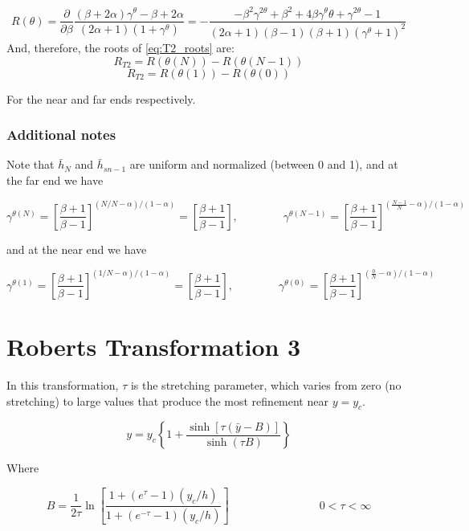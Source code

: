 \documentclass[11pt]{article}
\newcommand{\g}{\gamma}
\begin{document}
\begin{equation} \label{eq:T2_prime}
	R(\theta) = \frac{\partial}{\partial \beta}
	\frac{(\beta+2\alpha)\g^{\theta} - \beta + 2\alpha}{(2\alpha+1) \left(1+\g^{\theta} \right)}
	= - \frac{- \beta^{2} \g^{2 \theta} + \beta^{2} + 4 \beta \g^{\theta} \theta + \g^{2 \theta} - 1}{\left(2 \alpha + 1\right) \left(\beta - 1\right) \left(\beta + 1\right) \left(\g^{\theta} + 1\right)^{2}}
\end{equation}
And, therefore, the roots of \ref{eq:T2_roots} are:
\begin{equation}
	R_{T2} = R(\theta(N)) - R(\theta(N-1))
\end{equation}
\begin{equation}
	R_{T2} = R(\theta(1)) - R(\theta(0))
\end{equation}

For the near and far ends respectively.

\subsubsection{Additional notes}
Note that $\bar{h}_{N}$ and $\bar{h}_{sn-1}$ are uniform and normalized (between 0 and 1), and at the far end we have

\begin{equation}
	\g^{\theta(N)} = \left[
	\frac{\beta+1}{\beta-1}
	\right]^{(N/N-\alpha)/(1-\alpha)} =
	\left[
	\frac{\beta+1}{\beta-1}
	\right]
	, \qquad \qquad
	\g^{\theta(N-1)} = \left[
	\frac{\beta+1}{\beta-1}
	\right]^{(\frac{N-1}{N}-\alpha)/(1-\alpha)}
\end{equation}

and at the near end we have

\begin{equation}
	\g^{\theta(1)} = \left[
	\frac{\beta+1}{\beta-1}
	\right]^{(1/N-\alpha)/(1-\alpha)} =
	\left[
	\frac{\beta+1}{\beta-1}
	\right]
	, \qquad \qquad
	\g^{\theta(0)} = \left[
	\frac{\beta+1}{\beta-1}
	\right]^{(\frac{0}{N}-\alpha)/(1-\alpha)}
\end{equation}

\section{Roberts Transformation 3}
In this transformation, $\tau$ is the stretching parameter, which varies from zero (no stretching) to large values that produce the most refinement near $y=y_c$.

\begin{equation}
	y
	=
	y_c
	\left\{
	1
	+
	\frac{\sinh[\tau (\bar{y}-B)]}
	{\sinh(\tau B)}
	\right\}
\end{equation}

Where

\begin{equation}
	B
	=
	\frac{1}{2\tau}
	\ln
	\left[
	\frac{1+(e^\tau-1) (y_c/h)}{1+(e^{-\tau}-1) (y_c/h)}
	\right]
	\qquad \qquad \qquad \qquad
	0 <\tau < \infty
\end{equation}


\end{document}
